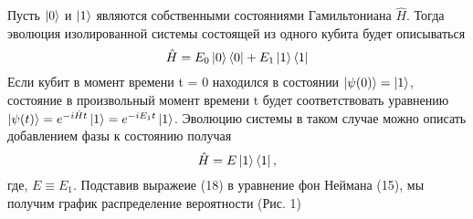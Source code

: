\documentclass[a4paper, 10pt]{article}
\begin{document}
    Пусть $\ket{0}$ и $\ket{1}$ являются собственными состояниями Гамильтониана  $\hat{H}$. Тогда эволюция изолированной системы состоящей из одного кубита будет описываться 
    \\
    \begin{equation}
        \hat{H} = E_0 \ket{0}\bra{0} + E_1 \ket{1}\bra{1}
    \end{equation}
   Если кубит в момент времени t = 0 находился в состоянии $\ket{\psi(0)} = \ket{1}$, состояние в произвольный момент времени t будет соответствовать уравнению $\ket{\psi(t)}=e^{-i\hat{H}t}\ket{1} = e^{-iE_1t}\ket{1}$. 
   Эволюцию системы в таком случае можно описать добавлением фазы к состоянию получая
    \begin{equation}
        \hat{H} = E \ket{1}\bra{1}, 
    \end{equation}
    где, $E \equiv E_1$. Подставив выражеие (18) в уравнение фон Неймана (15), мы получим график распределение вероятности (Рис. 1)

    
\end{document}
